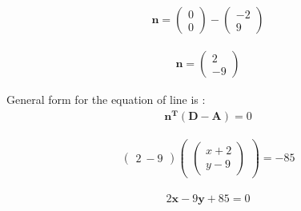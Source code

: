 \documentclass[journal,10pt,twocolumn]{article}
\let\vec\mathbf
\newcommand{\myvec}[1]{\ensuremath{\begin{pmatrix}#1\end{pmatrix}}}
\begin{document}
\begin{eqnarray*}
 \vec{n}=\myvec{0\\0} - \myvec{-2 \\9}
\end{eqnarray*}


\begin{eqnarray}
 \vec{n}=\myvec{2\\-9}
\end{eqnarray}


General form for the equation of line is :
\begin{eqnarray*}
\vec{n^T}\vec{(D-A)} = 0 
\end{eqnarray*}





\begin{eqnarray*}
 \myvec{2\ -9}\myvec{\myvec{x+2\\y-9}}=-85
\end{eqnarray*}

\begin{eqnarray}
 2\vec{x}-9\vec{y}+85=0
\end{eqnarray}
\end{document}
